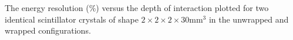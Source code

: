 \label{fig:energyresolution} The energy resolution ($\%$) versus the depth of interaction plotted for two identical scintillator crystals of shape $2\times2\times2\times30$mm$^3$ in the unwrapped and wrapped configurations.